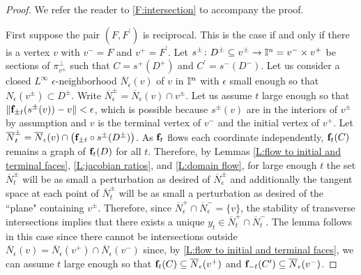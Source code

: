 \begin{proof}
	We refer the reader to \cref{F:intersection} to accompany the proof.

	First suppose the pair $(F,F^\prime)$ is reciprocal.
	This is the case if and only if there is a vertex $v$ with $v^- = F$ and $v^+ = F^\prime$.
	Let $s^\pm \colon D^\pm \subseteq v^\pm \to \mathbb{I}^n = v^- \times v^+$ be sections of $\pi_{v^\pm}^\perp$ such that $C = s^+(D^+)$ and $C^\prime = s^-(D^-)$.
	Let us consider a closed $L^\infty$ $\epsilon$-neighborhood $\overline N_\epsilon(v)$ of $v$ in $\mathbb{I}^n$ with $\epsilon$ small enough so that $N_\epsilon(v^\pm) \subset D^\pm$.
	Write $\overline N_\epsilon^\pm = \overline N_\epsilon(v) \cap v^\pm$.
	Let us assume $t$ large enough so that $\Vert{\mathbf{f}_{\pm t}(s^\pm(v)) - v}\Vert < \epsilon$, which is possible because $s^\pm(v)$ are in the interiors of $v^\pm$ by assumption and $v$ is the terminal vertex of $v^-$ and the initial vertex of $v^+$.
	Let $\overline N_t^\pm = \overline N_\epsilon(v) \cap \big(\mathbf{f}_{\pm t}\circ s^\pm (D^\pm)\big)$.
	As $\mathbf{f}_t$ flows each coordinate independently, $\mathbf{f}_t(C)$ remains a graph of $\mathbf{f}_t(D)$ for all $t$.
	Therefore, by Lemmas \ref{L:flow to initial and terminal faces}, \ref{L:jacobian ratios}, and \ref{L:domain flow}, for large enough $t$ the set $\overline N_t^\pm$ will be as small a perturbation as desired of $\overline N_\epsilon^\pm$ and additionally the tangent space at each point of $\overline N_t^\pm$ will be as small a perturbation as desired of the ``plane" containing $v^\pm$.
	Therefore, since $\overline N_\epsilon^+ \cap \overline N_\epsilon^- = \{v\}$, the stability of transverse intersections implies that there exists a unique $y_t \in \overline N_t^+ \cap \overline N_t^-$.
	The lemma follows in this case since there cannot be intersections outside $\overline N_\epsilon(v) = \overline N_\epsilon(v^+) \cap \overline N_\epsilon(v^-)$ since, by \cref{L:flow to initial and terminal faces}, we can assume $t$ large enough so that $\mathbf{f}_t(C) \subseteq \overline N_\epsilon(v^+)$ and $\mathbf{f}_{-t}(C^\prime) \subseteq \overline N_\epsilon(v^-)$.


\end{proof}
